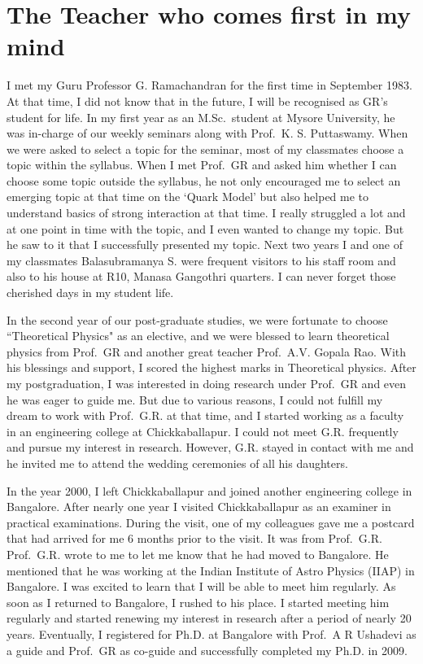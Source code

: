 \chapter{The Teacher who comes first in my mind}\label{chap33}




I met my Guru Professor G. Ramachandran for the first time in September 1983. At that time, I did not know that in the future, I will be recognised as GR's student for life. In my first year as an M.Sc.\ student at Mysore University, he was in-charge of our weekly seminars along with Prof.\ K. S. Puttaswamy. When we were asked to select a topic for the seminar, most of my classmates choose a topic within the syllabus. When I met Prof.\ GR and asked him whether I can choose some topic outside the syllabus, he not only encouraged me to select an emerging topic at that time on the `Quark Model' but also helped me to understand basics of strong interaction at that time. I really struggled a lot and at one point in time with the topic, and I even wanted to change my topic. But he saw to it that I successfully presented my topic. Next two years I and one of my classmates Balasubramanya S. were frequent visitors to his staff room and also to his house at R10, Manasa Gangothri quarters. I can never forget those cherished days in my student life. 

In the second year of our post-graduate studies, we were fortunate to choose ``Theoretical Physics" as an elective, and we were blessed to learn theoretical physics from Prof.\ GR and another great teacher Prof.\ A.V. Gopala Rao. With his blessings and support, I scored the highest marks in Theoretical physics. After my postgraduation, I was interested in doing research under Prof.\ GR and even he was eager to guide me. But due to various reasons, I could not fulfill my dream to work with Prof.\ G.R. at that time, and I started working as a faculty in an engineering college at Chickkaballapur. I could not meet G.R. frequently and pursue my interest in research. However, G.R. stayed in contact with me and he invited me to attend the wedding ceremonies of all his daughters. 

In the year 2000, I left Chickkaballapur and joined another engineering college in Bangalore. After nearly one year I visited Chickkaballapur as an examiner in practical examinations. During the visit, one of my colleagues gave me a postcard that had arrived for me 6 months prior to the visit. It was from Prof.\ G.R.  Prof.\ G.R. wrote to me to let me know that he had moved to Bangalore. He mentioned that he was working at the Indian Institute of Astro Physics (IIAP) in Bangalore. I was excited to learn that I will be able to meet him regularly. As soon as I returned to Bangalore, I rushed to his place. I started meeting him regularly and started renewing my interest in research after a period of nearly 20 years. Eventually, I registered for Ph.D. at Bangalore with Prof.\ A R Ushadevi as a guide and Prof.\ GR as co-guide and successfully completed my Ph.D. in 2009. 

